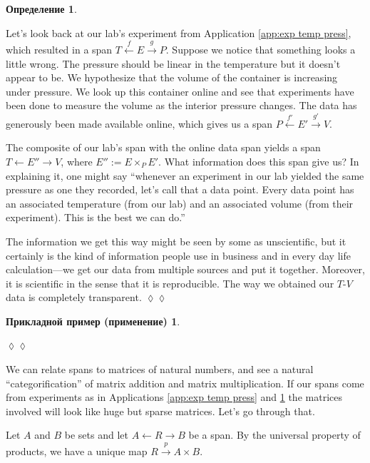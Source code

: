 \documentclass[a4paper]{book}
\def\to{\rightarrow}
\def\from{\leftarrow}
\newcommand{\To}[1]{\xrightarrow{#1}}
\newcommand{\From}[1]{\xleftarrow{#1}}
\theoremstyle{myth}
\newtheorem{appENG}[envENG]{\begin{english}Application\end{english}}
\newenvironment{applicationENG}{\begin{appENG}}{\hspace*{\fill}$\lozenge\lozenge$\end{appENG}}
\newtheorem{appRUS}[envRUS]{Прикладной пример (применение)}
\newtheorem{definitionRUS}[envRUS]{Определение}
\newenvironment{applicationRUS}{\begin{appRUS}}{\hspace*{\fill}$\lozenge\lozenge$\end{appRUS}}
\begin{document}
\begin{russian}
\begin{definitionRUS}\label{def:composite span}
 
\end{definitionRUS}

\begin{applicationENG}\label{app:exp temp press 2}
Let's look back at our lab's experiment from Application \ref{app:exp temp press}, which resulted in a span $T\From{f}E\To{g}P$. Suppose we notice that something looks a little wrong. The pressure should be linear in the temperature but it doesn't appear to be. We hypothesize that the volume of the container is increasing under pressure. We look up this container online and see that experiments have been done to measure the volume as the interior pressure changes. The data has generously been made available online, which gives us a span $P\From{f'}E'\To{g'}V$. 

The composite of our lab's span with the online data span yields a span $T\from E''\to V$, where $E'':=E\times_PE'$. What information does this span give us? In explaining it, one might say “whenever an experiment in our lab yielded the same pressure as one they recorded, let's call that a data point. Every data point has an associated temperature (from our lab) and an associated volume (from their experiment). This is the best we can do.” 

The information we get this way might be seen by some as unscientific, but it certainly is the kind of information people use in business and in every day life calculation---we get our data from multiple sources and put it together. Moreover, it is scientific in the sense that it is reproducible. The way we obtained our $T$-$V$ data is completely transparent.
\end{applicationENG}

\begin{applicationRUS}\label{app:exp temp press 2}
 
\end{applicationRUS}

We can relate spans to matrices of natural numbers, and see a natural “categorification” of matrix addition and matrix multiplication. If our spans come from experiments as in Applications \ref{app:exp temp press} and \ref{app:exp temp press 2} the matrices involved will look like huge but sparse matrices. Let's go through that.

 

Let $A$ and $B$ be sets and let $A\from R\to B$ be a span. By the universal property of products, we have a unique map $R\To{p}A\times B$. 


\end{russian}
\end{document}
